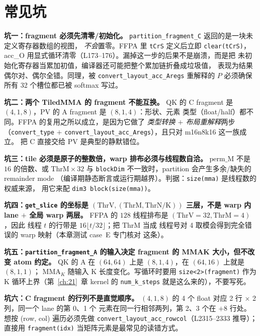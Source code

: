 \section{常见坑}

\textbf{坑一：fragment 必须先清零/初始化。}
\texttt{partition\_\allowbreak{}fragment\_\allowbreak{}C} 返回的是一块未定义寄存器数组的视图，
\emph{不会}置零。FFPA 里 \texttt{tCrS} 定义后立即 \texttt{clear(tCrS)}，
acc\_O 用显式循环清零（L173--176）。漏掉这一步的后果不是崩溃，而是把
未初始化寄存器当累加初值，编译器还可能把整个累加链折叠成垃圾值，
表现为结果偶尔对、偶尔全错。同理，被 \texttt{convert\_\allowbreak{}layout\_\allowbreak{}acc\_\allowbreak{}Aregs}
重解释的 $P$ 必须确保所有 32 个槽位都已被 softmax 写过。

\textbf{坑二：两个 TiledMMA 的 fragment 不能互换。}
QK 的 C fragment 是 $(4,1,8)$，PV 的 A fragment 是 $(8,1,4)$：形状、元素
类型（float/half）都不同。FFPA 的复用之所以成立，是因为它做了
\emph{类型转换 $+$ 布局重解释}两步（\texttt{convert\_\allowbreak{}type} $+$
\texttt{convert\_\allowbreak{}layout\_\allowbreak{}acc\_\allowbreak{}Aregs}），且只对 m16n8k16 这一族成立。
把 C 直接交给 PV 是典型的静默错位。

\textbf{坑三：tile 必须是原子的整数倍，warp 排布必须与线程数自洽。}
$\mathrm{perm\_M}$ 不是 $16$ 的倍数、或 $\mathrm{ThrM}\times 32$ 与
\texttt{blockDim} 不一致时，partition 会产生多余/缺失的 remainder mode
（编译期静态断言或运行期越界）。判据：\texttt{size(mma)} 是线程数的权威来源，
用它来配 \texttt{dim3 block\allowbreak{}(size\allowbreak{}(mma))}。

\textbf{坑四：\texttt{get\_slice} 的坐标是 $(\mathrm{ThrV},(\mathrm{ThrM},
\mathrm{ThrN/K}))$ 三层，不是 warp 内 lane $+$ 全局 warp 两层。}
FFPA 的 $128$ 线程排布是 $(\mathrm{ThrV}=32,\mathrm{ThrM}=4)$，因此
线程 $t$ 的行带是 $16\lfloor t/32\rfloor$；把 $\mathrm{ThrM}$ 当成
线程号对 4 取模会得到完全错误的 warp 映射（本章测试 case~E 专门核对
这条）。

\textbf{坑五：\texttt{partition\_\allowbreak{}fragment\_\allowbreak{}A} 的输入决定 fragment 的
MMAK 大小，但不改变 atom 约定。}
QK 的 A 在 $(64,64)$ 上是 $(8,1,4)$，在 $(64,16)$ 上就是 $(8,1,1)$；
$\mathrm{MMA}_K$ 随输入 K 长度变化。写循环时要用
\texttt{size\allowbreak{}<2>\allowbreak{}(fragment)} 作为 K 循环上界（第~\ref{ch:21}~章 kernel 的
\texttt{num\_k\_steps} 就是这么来的），不要写死。

\textbf{坑六：C fragment 的行列不是直觉顺序。}
$(4,1,8)$ 的 4 个 float 对应 2 行 $\times$ 2 列，同一个 lane 的第 0、1 个
元素在同一行相邻两列，第 2、3 个在 $+8$ 行处。想按 (row, col) 遍历必须先做
\texttt{convert\_\allowbreak{}layout\_\allowbreak{}acc\_\allowbreak{}rowcol}（L2315--2333 推导）；直接用
\texttt{fragment\allowbreak{}(idx)} 当矩阵元素是最常见的读错方式。

